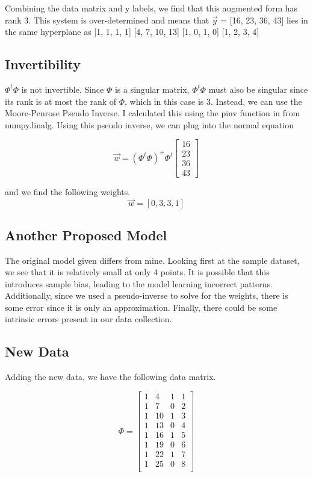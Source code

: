 \documentclass{article}
\begin{document}
\noindent
Combining the data matrix and y labels, we find that this augmented form has rank 3. This system is over-determined and means that $\Vec{y}$ = [16, 23, 36, 43] lies in the same hyperplane as [1, 1, 1, 1] [4, 7, 10, 13] [1, 0, 1, 0] [1, 2, 3, 4]

\subsection{Invertibility}
$\Phi^t \Phi$ is not invertible. Since $\Phi$ is a singular matrix, $\Phi^t \Phi$ must also be singular since its rank is at most the rank of $\Phi$, which in this case is 3. Instead, we can use the Moore-Penrose Pseudo Inverse. I calculated this using the pinv function in from numpy.linalg. Using this pseudo inverse, we can plug into the normal equation

\[
\Vec{w} = (\Phi^t \Phi)^+  \Phi^t 
\begin{bmatrix}
16\\
23\\
36\\
43
\end{bmatrix}
\]

\noindent
and we find the following weights.
\noindent
\[
\Vec{w} = [0, 3, 3, 1]
\]

\subsection{Another Proposed Model}

The original model given differs from mine. Looking first at the sample dataset, we see that it is relatively small at only 4 points. It is possible that this introduces sample bias, leading to the model learning incorrect patterns. Additionally, since we used a pseudo-inverse to solve for the weights, there is some error since it is only an approximation. Finally, there could be some intrinsic errors present in our data collection. 

\subsection{New Data}
Adding the new data, we have the following data matrix.

\[
\Phi = \begin{bmatrix}
1 & 4 & 1 & 1\\
1 & 7 & 0 & 2\\
1 & 10 & 1 & 3\\
1 & 13 & 0 & 4\\
1 & 16 & 1 & 5\\
1 & 19 & 0 & 6\\
1 & 22 & 1 & 7\\
1 & 25 & 0 & 8\\
\end{bmatrix}
\]
\end{document}

